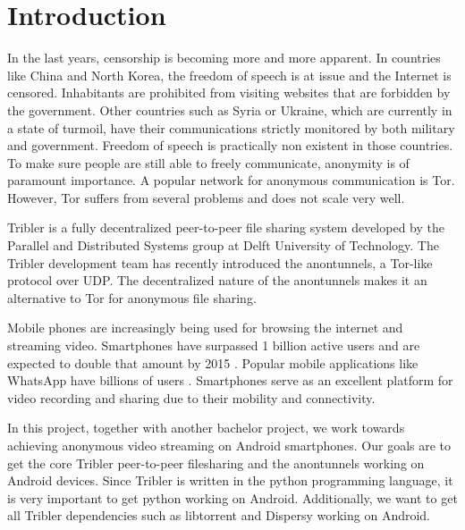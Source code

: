 \chapter{Introduction}

In the last years, censorship is becoming more and more apparent. In countries like China and North Korea, the freedom of speech is at issue and the Internet is censored. Inhabitants are prohibited from visiting websites that are forbidden by the government. Other countries such as Syria or Ukraine, which are currently in a state of turmoil, have their communications strictly monitored by both military and government. Freedom of speech is practically non existent in those countries. To make sure people are still able to freely communicate, anonymity is of paramount importance. A popular network for anonymous communication is Tor. However, Tor suffers from several problems and does not scale very well.

Tribler is a fully decentralized peer-to-peer file sharing system developed by the Parallel and Distributed Systems group at Delft University of Technology. The Tribler development team has recently introduced the anontunnels, a Tor-like protocol over UDP. The decentralized nature of the anontunnels makes it an alternative to Tor for anonymous file sharing.

Mobile phones are increasingly being used for browsing the internet and streaming video. Smartphones have surpassed 1 billion active users and are expected to double that amount by 2015 \cite{yang2015smartphones}. Popular mobile applications like WhatsApp have billions of users \cite{googleplayinstagram, googleplaywhatsapp}. Smartphones serve as an excellent platform for video recording and sharing due to their mobility and connectivity.

In this project, together with another bachelor project, we work towards achieving anonymous video streaming on Android smartphones. Our goals are to get the core Tribler peer-to-peer filesharing and the anontunnels working on Android devices. Since Tribler is written in the python programming language, it is very important to get python working on Android. Additionally, we want to get all Tribler dependencies such as libtorrent and Dispersy working on Android.